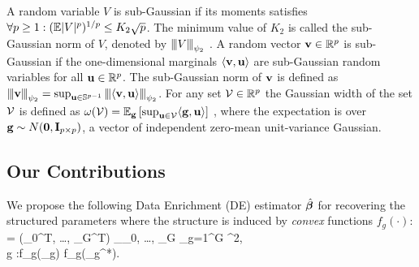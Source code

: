A random variable $V$ is sub-Gaussian if its moments satisfies $\forall p \geq 1: (\mathbb{E} |V|^p )^{1/p} \leq K_2 \sqrt{p}$.
The minimum value of $K_2$ is called the sub-Gaussian  norm of $V$, denoted by ${\left\vert\kern-0.25ex\left\vert\kern-0.25ex\left\vert V \right\vert\kern-0.25ex\right\vert\kern-0.25ex\right\vert}_{\psi_2}$ \cite{vers12}.
A random vector $\mathbf{v} \in \mathbb R^p$ is sub-Gaussian if the one-dimensional marginals $\langle \mathbf{v}, \mathbf{u} \rangle$ are sub-Gaussian random variables for all $\mathbf{u} \in \mathbb R^p$. The sub-Gaussian norm of $\mathbf{v}$ is defined \cite{vers12} as ${\left\vert\kern-0.25ex\left\vert\kern-0.25ex\left\vert \mathbf{v} \right\vert\kern-0.25ex\right\vert\kern-0.25ex\right\vert}_{\psi_2} = \sup_{\mathbf{u} \in \mathbb S^{p-1}} {\left\vert\kern-0.25ex\left\vert\kern-0.25ex\left\vert \langle \mathbf{v}, \mathbf{u} \rangle \right\vert\kern-0.25ex\right\vert\kern-0.25ex\right\vert}_{\psi_2}$.
For any set $\cV \in \reals^p$ the Gaussian width of the set $\cV$ is defined as $\omega(\cV) = \ex_\g \left[ \sup_{\u \in \cV} \langle \g, \u \rangle \right]$ \cite{vershynin2018high}, where the expectation is over $\mathbf{g} \sim N(\mathbf{0}, \mathbf{I}_{p \times p})$, a vector of independent zero-mean unit-variance Gaussian.



\subsection{Our Contributions}
We propose the following Data Enrichment (DE) estimator $\hat{\boldsymbol{\beta}}$ for recovering the structured parameters where the structure is induced by \emph{convex} functions $f_g(\cdot)$:
{\small\be
	\label{eq:super}
	\hbbe = (\hbbe_0^T, \dots, \hbbe_G^T) \in \argmin_{\bbeta _0, \dots, \bbeta _G}  \sum_{g=1}^{G} ^2,
	\\ \nr
	 \quad \forall g \in [G]:f_g(\bbeta _g) \leq f_g(\bbeta _g^*).
\ee}
